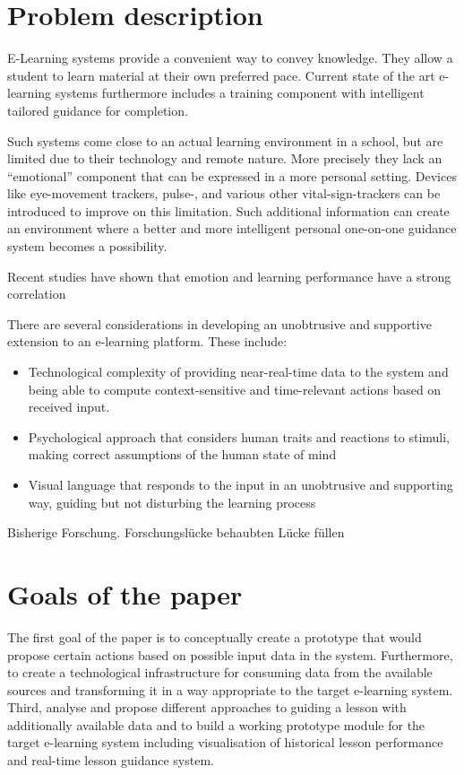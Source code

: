 \section {Problem description}

E-Learning systems provide a convenient way to convey knowledge. They allow a student to learn material at their own preferred pace. Current state of the art e-learning systems furthermore includes a training component with intelligent tailored guidance for completion. 

Such systems come close to an actual learning environment in a school, but are limited due to their technology and remote nature. More precisely they lack an “emotional” component that can be expressed in a more personal setting. Devices like eye-movement trackers, pulse-, and various other vital-sign-trackers can be introduced to improve on this limitation. Such additional information can create an environment where a better and more intelligent personal one-on-one guidance system becomes a possibility.

Recent studies have shown that emotion and learning performance have a strong correlation

There are several considerations in developing an unobtrusive and supportive extension to an e-learning platform. These include:
\begin{itemize}
	\item Technological complexity of providing near-real-time data to the system and being able to compute context-sensitive and time-relevant actions based on received input.
	\item Psychological approach that considers human traits and reactions to stimuli, making correct assumptions of the human state of mind
	\item Visual language that responds to the input in an unobtrusive and supporting way, guiding but not disturbing the learning process
\end{itemize}

Bisherige Forschung.
Forschungslücke behaubten
Lücke füllen

\section{Goals of the paper}

The first goal of the paper is to conceptually create a prototype that would propose certain actions based on possible input data in the system. Furthermore, to create a technological infrastructure for consuming data from the available sources and transforming it in a way appropriate to the target e-learning system. Third, analyse and propose different approaches to guiding a lesson with additionally available data and to build a working prototype module for the target e-learning system including visualisation of historical lesson performance and real-time lesson guidance system.

